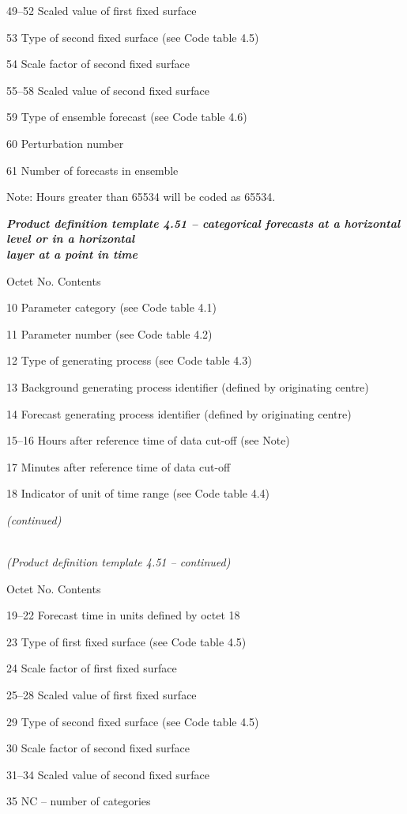 49--52 Scaled value of first fixed surface

53 Type of second fixed surface (see Code table 4.5)

54 Scale factor of second fixed surface

55--58 Scaled value of second fixed surface

59 Type of ensemble forecast (see Code table 4.6)

60 Perturbation number

61 Number of forecasts in ensemble

Note: Hours greater than 65534 will be coded as 65534.

\emph{\textbf{Product definition template 4.51 -- categorical forecasts at a horizontal level or in a horizontal\\
layer at a point in time}}

Octet No. Contents

10 Parameter category (see Code table 4.1)

11 Parameter number (see Code table 4.2)

12 Type of generating process (see Code table 4.3)

13 Background generating process identifier (defined by originating centre)

14 Forecast generating process identifier (defined by originating centre)

15--16 Hours after reference time of data cut-off (see Note)

17 Minutes after reference time of data cut-off

18 Indicator of unit of time range (see Code table 4.4)

\emph{(continued)}

\emph{\\
(Product definition template 4.51 -- continued)}

Octet No. Contents

19--22 Forecast time in units defined by octet 18

23 Type of first fixed surface (see Code table 4.5)

24 Scale factor of first fixed surface

25--28 Scaled value of first fixed surface

29 Type of second fixed surface (see Code table 4.5)

30 Scale factor of second fixed surface

31--34 Scaled value of second fixed surface

35 NC -- number of categories

